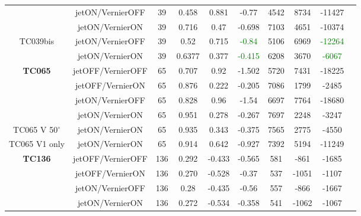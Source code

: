 \documentclass[12pt]{article}
\begin{document}
\begin{table}[H]
{\begin{tabular}{|c|c|c|c|c|c|c|c|c|c|}
                       & jetON/VernierOFF & 39 & 0.458 & 0.881  & -0.77 & 4542 & 8734 & -11427 \\ \cline{2-9}
                       & jetON/VernierON & 39 & 0.716 & 0.47 & -0.698 & 7103 & 4651 & -10374 \\ \hline \hline
%
\multirow{2}{*}{TC039bis} & jetON/VernierOFF & 39 & 0.52 & 0.715 & \textcolor{green}{-0.84} & 5106 & 6969 & \textcolor{green}{-12264} \\ \cline{2-9}
                       & jetON/VernierON & 39 & 0.6377 & 0.377 & \textcolor{green}{-0.415} & 6208 & 3670 & \textcolor{green}{-6067} \\ \hline \hline
%
\multirow{4}{*}{\textbf{TC065}} 
                       & jetOFF/VernierOFF & 65 & 0.707 & 0.92 & -1.502 & 5720 & 7431 & -18225 \\ \cline{2-9}
                       & jetOFF/VernierON & 65 & 0.876 & 0.222 & -0.205 & 7086 & 1799 & -2485 \\ \cline{2-9}
                       & jetON/VernierOFF & 65 & 0.828 & 0.96 & -1.54 & 6697 & 7764 & -18680 \\ \cline{2-9}
                       & jetON/VernierON & 65 & 0.951 & 0.278 & -0.267 & 7697 & 2248 & -3247 \\ \hline \hline
%
\multirow{1}{*}{TC065 V 50$^\circ$} 
                        & jetON/VernierON & 65 & 0.935 & 0.343 & -0.375 & 7565 & 2775 & -4550 \\ \hline \hline
%
\multirow{1}{*}{TC065 V1 only} 
                        & jetON/VernierON & 65 & 0.914 & 0.642 & -0.927 & 7392 & 5194 & -11249 \\ \hline \hline                        
%                        
\multirow{4}{*}{\textbf{TC136}} & jetOFF/VernierOFF & 136 & 0.292 & -0.433 & -0.565 & 581 & -861 & -1685 \\ \cline{2-9}
                       & jetOFF/VernierON & 136 & 0.270 & -0.528 & -0.37 & 537 & -1051 & -1107 \\ \cline{2-9}
                       & jetON/VernierOFF & 136 & 0.28 & -0.435 & -0.56 & 557 & -866  & -1667 \\ \cline{2-9}
                       & jetON/VernierON & 136 & 0.272 & -0.534 & -0.358 & 541 & -1062 & -1067 \\ \hline \hline
%
\end{tabular}}
\end{table}
\end{document}
